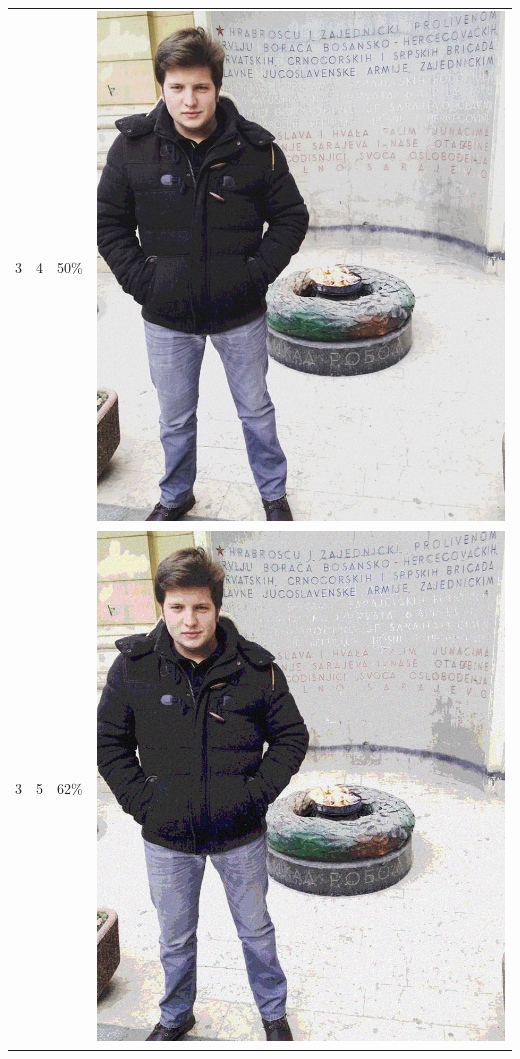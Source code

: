 \documentclass[times, utf8, seminar, numeric]{fer}
\begin{document}
\begin{center}
\begin{longtable}{|c|c|c|c|}
3 & 4 &50\% & \includegraphics[scale=0.3]{../benchmark_results/pattern/3_components-4_bits.png} \\
3 & 5 &62\% & \includegraphics[scale=0.3]{../benchmark_results/pattern/3_components-5_bits.png} \\

\end{longtable}
\end{center}
\end{document}
